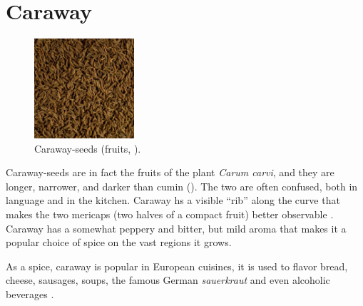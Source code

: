 
\section{Caraway}
\label{sec:caraway}




\begin{figure}
	\vspace{-\baselineskip}
	\includegraphics[width=0.33\textwidth]{imgs/spices/caraway-1.jpg}
	\caption{Caraway-seeds (fruits, ).}
	\label{fig:caraway}
\end{figure}

Caraway-seeds are in fact the fruits of the plant \textit{Carum carvi}, and they are longer, narrower, and darker than cumin (). The two are often confused, both in language and in the kitchen. Caraway hs a visible ``rib'' along the curve that makes the two mericaps (two halves of a compact fruit) better observable \autocite[100]{van_wyk_culinary_2014}. Caraway has a somewhat peppery and bitter, but mild aroma that makes it a popular choice of spice on the vast regions it grows. 

As a spice, caraway is popular in European cuisines, it is used to flavor bread, cheese, sausages, soups, the famous German \textit{sauerkraut} and even alcoholic beverages \autocite{van_wyk_culinary_2014}.




